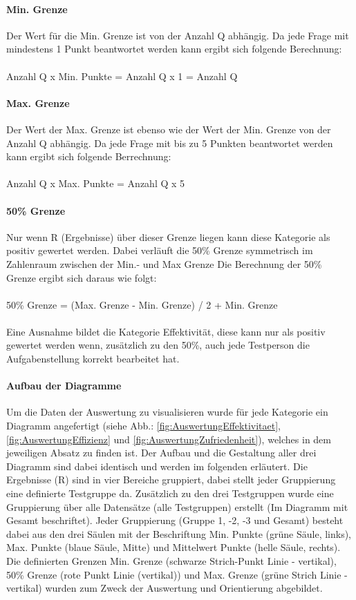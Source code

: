 \documentclass[Bachelorarbeit.tex]{subfiles}
\begin{document}
\paragraph{Min. Grenze} Der Wert für die Min. Grenze ist von der Anzahl Q abhängig. Da jede Frage mit mindestens 1 Punkt beantwortet werden kann ergibt sich folgende Berechnung:\\
\\
Anzahl Q x Min. Punkte = Anzahl Q x 1 = Anzahl Q
\paragraph{Max. Grenze} Der Wert der Max. Grenze ist ebenso wie der Wert der Min. Grenze von der Anzahl Q abhängig. 
Da jede Frage mit bis zu 5 Punkten beantwortet werden kann ergibt sich folgende Berrechnung:\\
\\
Anzahl Q x Max. Punkte = Anzahl Q x 5 

\paragraph{50\% Grenze} Nur wenn R (Ergebnisse)  über dieser Grenze liegen kann diese Kategorie als positiv gewertet werden.
Dabei verläuft die 50\% Grenze symmetrisch im Zahlenraum zwischen der Min.- und Max Grenze
Die Berechnung der 50\% Grenze ergibt sich daraus wie folgt:\\
\\
50\% Grenze = (Max. Grenze - Min. Grenze) / 2 + Min. Grenze\\
\\
Eine Ausnahme bildet die Kategorie Effektivität, diese kann nur als positiv gewertet werden wenn, zusätzlich zu den 50\%, auch jede Testperson die Aufgabenstellung korrekt bearbeitet hat.


\paragraph{Aufbau der Diagramme} \label{AufbauDiagramm} Um die Daten der Auswertung zu visualisieren wurde für jede Kategorie ein Diagramm angefertigt (siehe Abb.: \ref{fig:AuswertungEffektivitaet}, \ref{fig:AuswertungEffizienz} und \ref{fig:AuswertungZufriedenheit}), welches in dem jeweiligen Absatz zu finden ist.
Der Aufbau und die Gestaltung aller drei Diagramm sind dabei identisch und werden im folgenden erläutert.
Die Ergebnisse (R) sind in vier Bereiche gruppiert, dabei stellt jeder Gruppierung eine definierte Testgruppe da. 
Zusätzlich zu den drei Testgruppen wurde eine Gruppierung über alle Datensätze (alle Testgruppen) erstellt (Im Diagramm mit Gesamt beschriftet). 
Jeder Gruppierung (Gruppe 1, -2, -3 und Gesamt) besteht dabei aus den drei Säulen mit der Beschriftung Min. Punkte (grüne Säule, links), Max. Punkte (blaue Säule, Mitte) und Mittelwert Punkte (helle Säule, rechts). 
Die definierten Grenzen Min. Grenze (schwarze Strich-Punkt Linie - vertikal), 50\% Grenze (rote Punkt Linie (vertikal)) und Max. Grenze (grüne Strich Linie - vertikal) wurden zum Zweck der Auswertung und Orientierung abgebildet.
\end{document}
